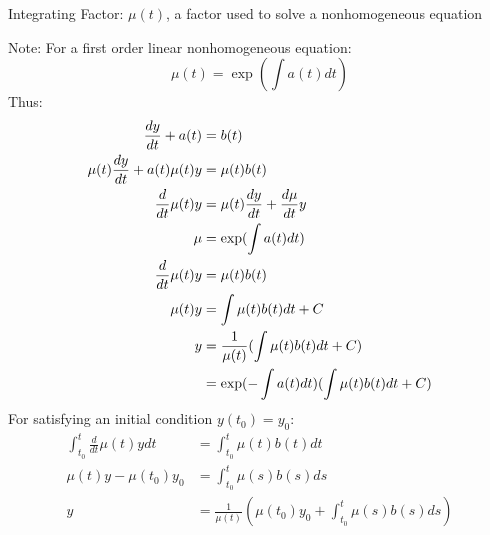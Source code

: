 \documentclass[12pt]{article}
\begin{document}
\begin{definition} Integrating Factor: $\mu(t)$, a factor used to solve a nonhomogeneous equation \end{definition} 
Note: For a first order linear nonhomogeneous equation: $$\mu(t) = \exp(\int a(t)dt) $$ 
Thus: $$\begin{aligned} \frac{dy}{dt} + a(t) &= b(t) \\ \mu(t)\frac{dy}{dt} + a(t)\mu(t)y &= \mu(t)b(t) \\ \frac{d}{dt} \mu(t)y &= \mu(t)\frac{dy}{dt} + \frac{d\mu}{dt}y \\ \mu &= \exp(\int a(t)dt) \\ \frac{d}{dt} \mu(t)y &= \mu(t)b(t) \\ \mu(t)y &= \int \mu(t)b(t)dt + C \\ y &= \frac{1}{\mu(t)}(\int \mu(t)b(t)dt + C) \\ &= \exp(-\int a(t)dt)(\int \mu(t)b(t)dt + C) \end{aligned} $$ 
For satisfying an initial condition $y(t_0) = y_0$: $$ \begin{aligned} 
\int_{t_0}^t \frac{d}{dt} \mu(t)ydt &= \int_{t_0}^t \mu(t)b(t)dt \\ \mu(t)y - \mu(t_0)y_0 &= \int_{t_0}^t \mu(s)b(s)ds \\ y &= \frac{1}{\mu(t)}(\mu(t_0)y_0 + \int_{t_0}^t \mu(s)b(s)ds) \end{aligned} $$ 
\end{document}
